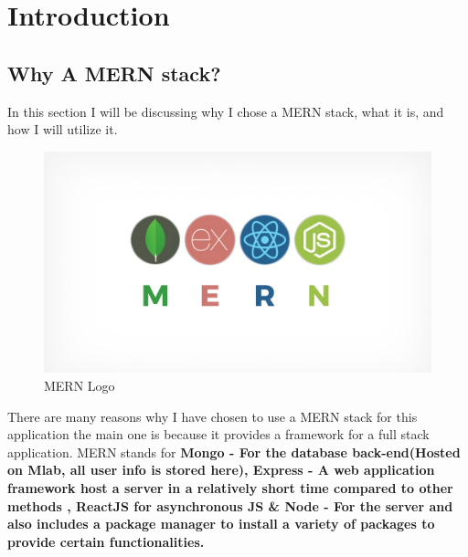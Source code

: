 \chapter{Introduction}
\section {Why A MERN stack?}
In this section I will be discussing why I chose a MERN stack, what it is, and how I will utilize it.
\begin{center}
  \begin{figure}[h!]
    \includegraphics[width=\textwidth]{img/mern.jpeg}
    \caption{MERN Logo}
    \label{fig: Image of MERN stack logo}
  \end{figure}
\end{center}
There are many reasons why I have chosen to use a MERN stack for this
application the main one is because it provides a framework for a full stack
application.
MERN stands for \textbf{Mongo - For the database back-end(Hosted on Mlab, all user info is stored here),
Express - A web application framework
host a server in a relatively short time compared to other methods
, ReactJS for asynchronous JS \& Node - For the server and also includes a package manager to install a variety of packages to provide certain functionalities.}
\cite{MERN}
\\
